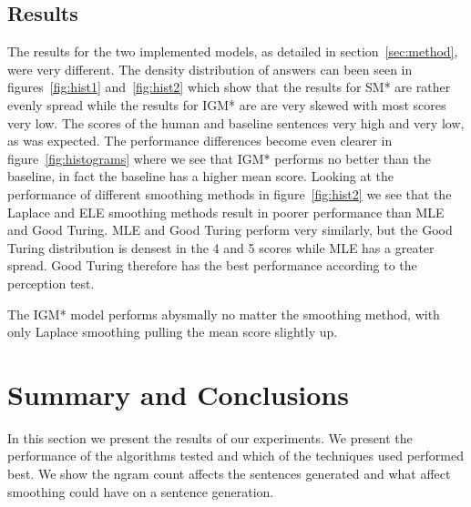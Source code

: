 \documentclass[a4paper,12pt]{article}
\begin{document}
\subsection{Results}
\label{sec:results}
The results for the two implemented models, as detailed in section~\ref{sec:method}, were very different. The density distribution of answers can been seen in figures~\ref{fig:hist1} and~\ref{fig:hist2} which show that the results for SM* are rather evenly spread while the results for IGM* are are very skewed with most scores very low. The scores of the human and baseline sentences very high and very low, as was expected. The performance differences become even clearer in figure~\ref{fig:histograms} where we see that IGM* performs no better than the baseline, in fact the baseline has a higher mean score. Looking at the performance of different smoothing methods in figure~\ref{fig:hist2} we see that the Laplace and ELE smoothing methods result in poorer performance than MLE and Good Turing. MLE and Good Turing perform very similarly, but the Good Turing distribution is densest in the 4 and 5 scores while MLE has a greater spread. Good Turing therefore has the best performance according to the perception test.

The IGM* model performs abysmally no matter the smoothing method, with only Laplace smoothing pulling the mean score slightly up.



\section{Summary and Conclusions}
\label{sec:summary}

In this section we present the results of our experiments. We present the performance of the algorithms tested and which of the techniques used performed best. We show the ngram count affects the sentences generated and what affect smoothing could have on a sentence generation.
\end{document}
